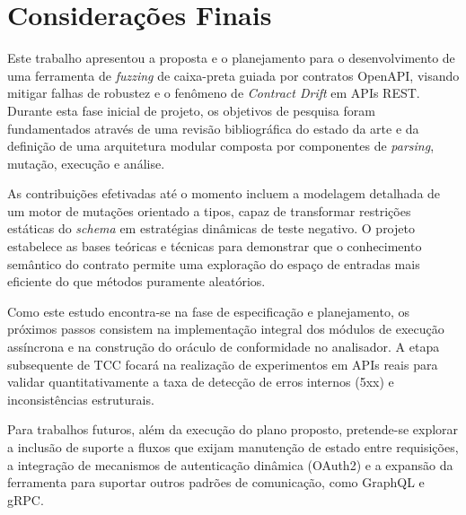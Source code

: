 \section{Considerações Finais}\label{sec:conclusoes}

Este trabalho apresentou a proposta e o planejamento para o desenvolvimento de uma ferramenta de \textit{fuzzing} de caixa-preta guiada por contratos OpenAPI, visando mitigar falhas de robustez e o fenômeno de \textit{Contract Drift} em APIs REST. Durante esta fase inicial de projeto, os objetivos de pesquisa foram fundamentados através de uma revisão bibliográfica do estado da arte e da definição de uma arquitetura modular composta por componentes de \textit{parsing}, mutação, execução e análise.

As contribuições efetivadas até o momento incluem a modelagem detalhada de um motor de mutações orientado a tipos, capaz de transformar restrições estáticas do \textit{schema} em estratégias dinâmicas de teste negativo. O projeto estabelece as bases teóricas e técnicas para demonstrar que o conhecimento semântico do contrato permite uma exploração do espaço de entradas mais eficiente do que métodos puramente aleatórios.

Como este estudo encontra-se na fase de especificação e planejamento, os próximos passos consistem na implementação integral dos módulos de execução assíncrona e na construção do oráculo de conformidade no analisador. A etapa subsequente de TCC focará na realização de experimentos em APIs reais para validar quantitativamente a taxa de detecção de erros internos (5xx) e inconsistências estruturais.

Para trabalhos futuros, além da execução do plano proposto, pretende-se explorar a inclusão de suporte a fluxos que exijam manutenção de estado entre requisições, a integração de mecanismos de autenticação dinâmica (OAuth2) e a expansão da ferramenta para suportar outros padrões de comunicação, como GraphQL e gRPC.

